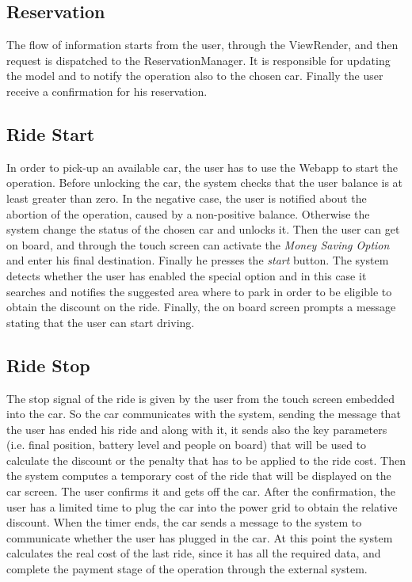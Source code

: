 \documentclass[11pt,a4paper]{report}
\begin{document}
\subsection{Reservation}
The flow of information starts from the user, through the ViewRender, and then request is dispatched to the ReservationManager. It is responsible for updating the model and to notify the operation also to the chosen car. Finally the user receive a confirmation for his reservation.
\subsection{Ride Start}
In order to pick-up an available car, the user has to use the Webapp to start the operation. Before unlocking the car, the system checks that the user balance is at least greater than zero. In the negative case, the user is notified about the abortion of the operation, caused by a non-positive balance. Otherwise the system change the status of the chosen car and unlocks it. Then the user can get on board, and through the touch screen can activate the \textit{Money Saving Option} and enter his final destination. Finally he presses the \textit{start} button. The system detects whether the user has enabled the special option and in this case it searches and notifies the suggested area where to park in order to be eligible to obtain the discount on the ride.
Finally, the on board screen prompts a message stating that the user can start driving.
\subsection{Ride Stop}
The stop signal of the ride is given by the user from the touch screen embedded into the car. So the car communicates with the system, sending the message that the user has ended his ride and along with it, it sends also the key parameters (i.e. final position, battery level and people on board) that will be used to calculate the discount or the penalty that has to be applied to the ride cost. Then the system computes a temporary cost of the ride that will be displayed on the car screen. The user confirms it and gets off the car. After the confirmation, the user has a limited time to plug the car into the power grid to obtain the relative discount. When the timer ends, the car sends a message to the system to communicate whether the user has plugged in the car. At this point the system calculates the real cost of the last ride, since it has all the required data, and complete the payment stage of the operation through the external system.
\end{document}
